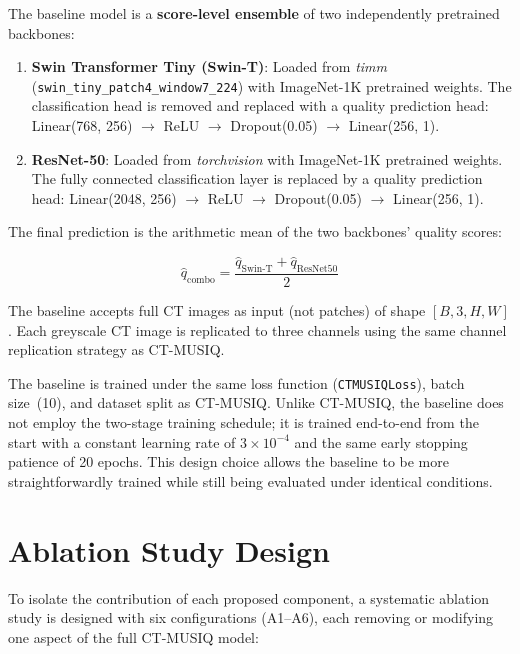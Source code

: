 The baseline model is a \textbf{score-level ensemble} of two independently pretrained
backbones:

\begin{enumerate}
    \item \textbf{Swin Transformer Tiny (Swin-T)}: Loaded from \textit{timm}
          (\texttt{swin\_tiny\_patch4\_window7\_224}) with ImageNet-1K pretrained
          weights. The classification head is removed and replaced with a quality
          prediction head: Linear(768, 256) $\to$ ReLU $\to$ Dropout(0.05) $\to$
          Linear(256, 1).
    \item \textbf{ResNet-50}: Loaded from \textit{torchvision} with ImageNet-1K
          pretrained weights. The fully connected classification layer is replaced by a
          quality prediction head: Linear(2048, 256) $\to$ ReLU $\to$ Dropout(0.05)
          $\to$ Linear(256, 1).
\end{enumerate}

The final prediction is the arithmetic mean of the two backbones' quality scores:

\begin{equation}
    \hat{q}_{\text{combo}} = \frac{\hat{q}_{\text{Swin-T}} + \hat{q}_{\text{ResNet50}}}{2}
    \label{eq:ensemble}
\end{equation}

The baseline accepts full CT images as input (not patches) of shape $[B, 3, H, W]$.
Each greyscale CT image is replicated to three channels using the same channel
replication strategy as CT-MUSIQ.

The baseline is trained under the same loss function (\texttt{CTMUSIQLoss}), batch
size~(10), and dataset split as CT-MUSIQ. Unlike CT-MUSIQ, the baseline does not employ
the two-stage training schedule; it is trained end-to-end from the start with a constant
learning rate of $3 \times 10^{-4}$ and the same early stopping patience of 20 epochs.
This design choice allows the baseline to be more straightforwardly trained while still
being evaluated under identical conditions.


\section{Ablation Study Design}
\label{sec:ablation}

To isolate the contribution of each proposed component, a systematic ablation study is
designed with six configurations (A1--A6), each removing or modifying one aspect of
the full CT-MUSIQ model:

